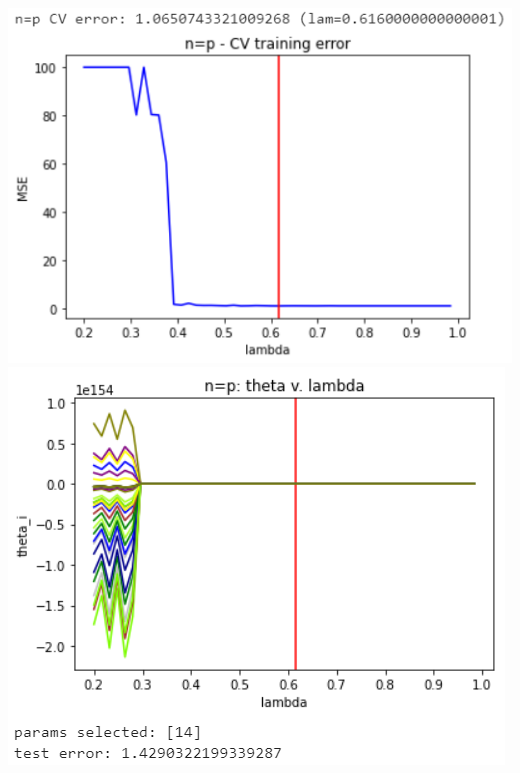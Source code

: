 \documentclass[11pt]{article}
\begin{document}
\begin{center}
\includegraphics[scale=0.7]{charts/ridge_q_corr_n_eq_p_err.PNG}
\includegraphics[scale=0.7]{charts/ridge_q_corr_n_eq_p_thetas.PNG}


\end{center}
\end{document}
